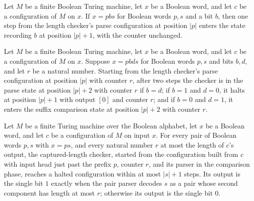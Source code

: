 \begin{lemma}
\label{Turing.FinTM.lenParse_first}
\leanok
{}
Let $M$ be a finite Boolean Turing machine, let $x$ be a Boolean word, and let $c$ be a
configuration of $M$ on $x$. If $x=pbs$ for Boolean words $p,s$ and a bit $b$, then one
step from the length checker’s parse configuration at position $|p|$ enters the state
recording $b$ at position $|p|+1$, with the counter unchanged.
\end{lemma}

\begin{lemma}
\label{Turing.FinTM.lenParse_block}
\leanok
{}
Let $M$ be a finite Boolean Turing machine, let $x$ be a Boolean word, and let $c$ be a
configuration of $M$ on $x$. Suppose $x=pbd s$ for Boolean words $p,s$ and bits $b,d$,
and let $r$ be a natural number. Starting from the length checker’s parse configuration
at position $|p|$ with counter $r$, after two steps the checker is in the parse state at
position $|p|+2$ with counter $r$ if $b=d$; if $b=1$ and $d=0$, it halts at position
$|p|+1$ with output $[0]$ and counter $r$; and if $b=0$ and $d=1$, it enters the suffix
comparison state at position $|p|+2$ with counter $r$.
\end{lemma}

\begin{lemma}
\label{Turing.FinTM.lenParse_run}
\leanok
{}
Let $M$ be a finite Turing machine over the Boolean alphabet, let $x$ be a Boolean word,
and let $c$ be a configuration of $M$ on input $x$. For every pair of Boolean words
$p,s$ with $x=ps$, and every natural number $r$ at most the length of $c$’s output, the
captured-length checker, started from the configuration built from $c$ with input head
just past the prefix $p$, counter $r$, and its parser in the comparison phase, reaches a
halted configuration within at most $|s|+1$ steps. Its output is the single bit $1$
exactly when the pair parser decodes $s$ as a pair whose second component has length at
most $r$; otherwise its output is the single bit $0$.
\end{lemma}

